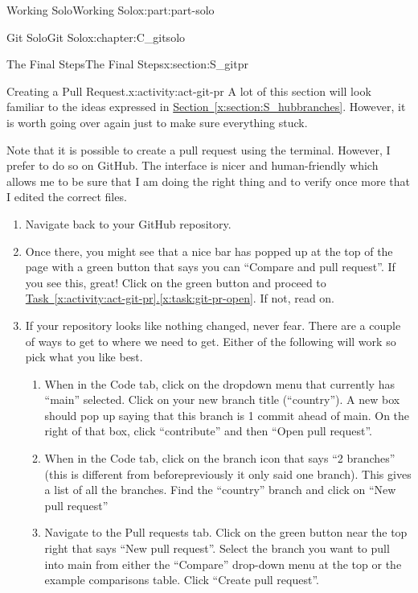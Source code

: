 \documentclass[oneside,10pt,]{book}
\newcommand{\xreffont}{\relax}
\begin{document}
\begin{partptx}{Working Solo}{}{Working Solo}{}{}{x:part:part-solo}
\begin{chapterptx}{Git Solo}{}{Git Solo}{}{}{x:chapter:C_gitsolo}
\begin{sectionptx}{The Final Steps}{}{The Final Steps}{}{}{x:section:S_gitpr}
\begin{introduction}{}
\end{introduction}%
\begin{activity}{Creating a Pull Request.}{x:activity:act-git-pr}%
%
A lot of this section will look familiar to the ideas expressed in \hyperref[x:section:S_hubbranches]{Section~{\xreffont\ref{x:section:S_hubbranches}}}. However, it is worth going over again just to make sure everything stuck.%
\par
Note that it is possible to create a pull request using the terminal. However, I prefer to do so on GitHub. The interface is nicer and human-friendly which allows me to be sure that I am doing the right thing and to verify once more that I edited the correct files.%
\begin{enumerate}[font=\bfseries,label=(\alph*),ref=\alph*]
\item{}Navigate back to your GitHub repository.%
\item{}Once there, you might see that a nice bar has popped up at the top of the page with a green button that says you can ``Compare and pull request''. If you see this, great! Click on the green button and proceed to \hyperref[x:task:git-pr-open]{Task~{\xreffont\ref{x:activity:act-git-pr}}.{\xreffont\ref{x:task:git-pr-open}}}. If not, read on.%
\item\label{x:task:git-pr-create}If your repository looks like nothing changed, never fear. There are a couple of ways to get to where we need to get. Either of the following will work so pick what you like best.%
\begin{enumerate}
\item{}When in the Code tab, click on the dropdown menu that currently has ``main'' selected. Click on your new branch title (``country''). A new box should pop up saying that this branch is 1 commit ahead of main. On the right of that box, click ``contribute'' and then ``Open pull request''.%
\item{}When in the Code tab, click on the branch icon that says ``2 branches'' (this is different from before\textellipsis{}previously it only said one branch). This gives a list of all the branches. Find the ``country'' branch and click on ``New pull request''%
\item{}Navigate to the Pull requests tab. Click on the green button near the top right that says ``New pull request''. Select the branch you want to pull into main from either the ``Compare'' drop-down menu at the top or the example comparisons table. Click ``Create pull request''.%
\end{enumerate}

\end{enumerate}
\end{activity}
\end{sectionptx}
\end{chapterptx}
\end{partptx}
\end{document}
